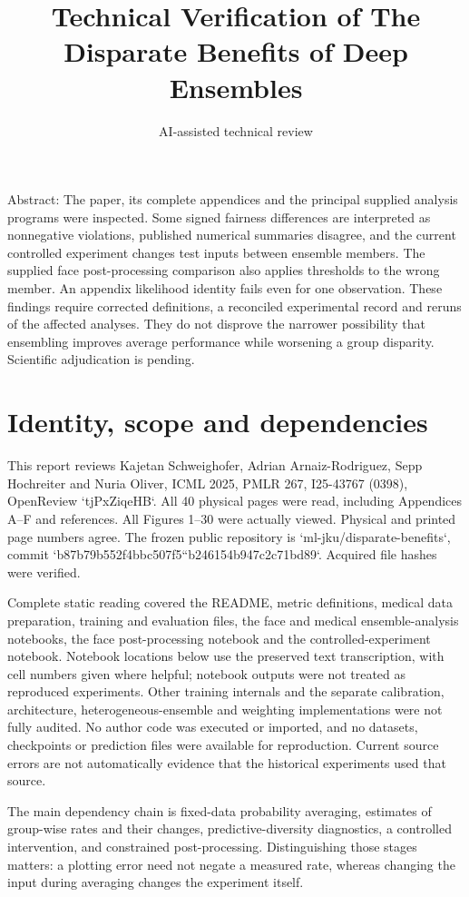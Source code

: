 \documentclass[10pt]{article}
\title{Technical Verification of The Disparate Benefits of Deep Ensembles}
\author{AI-assisted technical review}
\date{}
\begin{document}
\maketitle
Abstract: The paper, its complete appendices and the principal supplied analysis programs were inspected. Some signed fairness differences are interpreted as nonnegative violations, published numerical summaries disagree, and the current controlled experiment changes test inputs between ensemble members. The supplied face post-processing comparison also applies thresholds to the wrong member. An appendix likelihood identity fails even for one observation. These findings require corrected definitions, a reconciled experimental record and reruns of the affected analyses. They do not disprove the narrower possibility that ensembling improves average performance while worsening a group disparity. Scientific adjudication is pending.\par
\section*{Identity, scope and dependencies}
This report reviews Kajetan Schweighofer, Adrian Arnaiz-Rodriguez, Sepp Hochreiter and Nuria Oliver, ICML 2025, PMLR 267, I25-43767 (0398), OpenReview `tjPxZiqeHB`. All 40 physical pages were read, including Appendices A–F and references. All Figures 1–30 were actually viewed. Physical and printed page numbers agree. The frozen public repository is `ml-jku/disparate-benefits`, commit `b87b79b552f4bbc507f5``b246154b947c2c71bd89`. Acquired file hashes were verified.\par
Complete static reading covered the README, metric definitions, medical data preparation, training and evaluation files, the face and medical ensemble-analysis notebooks, the face post-processing notebook and the controlled-experiment notebook. Notebook locations below use the preserved text transcription, with cell numbers given where helpful; notebook outputs were not treated as reproduced experiments. Other training internals and the separate calibration, architecture, heterogeneous-ensemble and weighting implementations were not fully audited. No author code was executed or imported, and no datasets, checkpoints or prediction files were available for reproduction. Current source errors are not automatically evidence that the historical experiments used that source.\par
The main dependency chain is fixed-data probability averaging, estimates of group-wise rates and their changes, predictive-diversity diagnostics, a controlled intervention, and constrained post-processing. Distinguishing those stages matters: a plotting error need not negate a measured rate, whereas changing the input during averaging changes the experiment itself.\par
\end{document}
